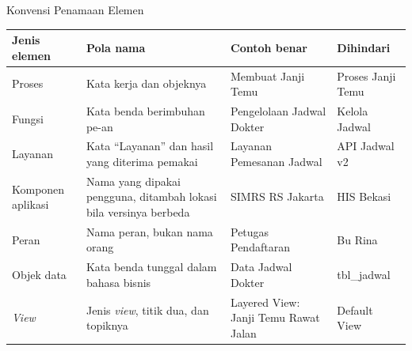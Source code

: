 \documentclass[aspectratio=169, table, 12pt]{beamer}
\begin{document}
\begin{frame}{{\Large Konvensi Penamaan Elemen}}
  \scriptsize
  \begin{tabularx}{\textwidth}{>{\raggedright\arraybackslash}p{2.4cm}
      >{\raggedright\arraybackslash}X >{\raggedright\arraybackslash}p{3.4cm}
      >{\raggedright\arraybackslash}p{2.2cm}}
    \hline
    \textbf{Jenis elemen} & \textbf{Pola nama} & \textbf{Contoh benar} & \textbf{Dihindari} \\
    \hline
    Proses & Kata kerja dan objeknya & Membuat Janji Temu & Proses Janji Temu \\
    \hline
    Fungsi & Kata benda berimbuhan pe-an & Pengelolaan Jadwal Dokter & Kelola Jadwal \\
    \hline
    Layanan & Kata ``Layanan'' dan hasil yang diterima pemakai & Layanan Pemesanan Jadwal & API Jadwal v2 \\
    \hline
    Komponen aplikasi & Nama yang dipakai pengguna, ditambah lokasi bila versinya berbeda & SIMRS RS Jakarta & HIS Bekasi \\
    \hline
    Peran & Nama peran, bukan nama orang & Petugas Pendaftaran & Bu Rina \\
    \hline
    Objek data & Kata benda tunggal dalam bahasa bisnis & Data Jadwal Dokter & tbl\_jadwal \\
    \hline
    \textit{View} & Jenis \textit{view}, titik dua, dan topiknya & Layered View: Janji Temu Rawat Jalan & Default View \\
    \hline
  \end{tabularx}
\end{frame}
\end{document}
